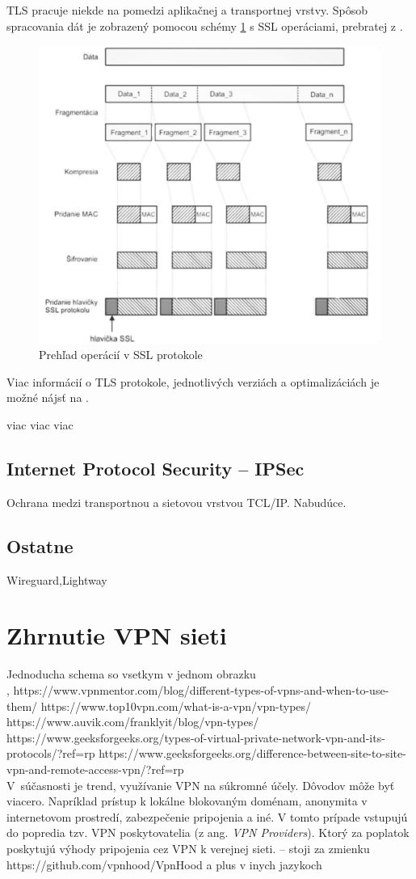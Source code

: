 TLS pracuje niekde na pomedzi aplikačnej a transportnej vrstvy. Spôsob spracovania dát je zobrazený pomocou schémy \ref{ssl} s SSL operáciami, prebratej z \cite{biks}. 
\begin{figure}[!ht]
	\centering
	\includegraphics[width=0.7\linewidth]{figures/ssl}
	\caption{Prehľad operácií v SSL protokole}
	\label{ssl}
\end{figure}

Viac informácií o TLS protokole, jednotlivých verziách a optimalizáciách je možné nájsť na \cite{tls}. 

viac viac viac

\subsection{Internet Protocol Security  -- IPSec}
Ochrana medzi transportnou a sietovou vrstvou TCL/IP.
Nabudúce. \cite{biks}

\subsection{Ostatne}
Wireguard,Lightway
 
\section{Zhrnutie VPN sieti}
Jednoducha schema so vsetkym v jednom obrazku \\

 
\cite{divvpn}, \cite{ciscovpn}
https://www.vpnmentor.com/blog/different-types-of-vpns-and-when-to-use-them/
https://www.top10vpn.com/what-is-a-vpn/vpn-types/
https://www.auvik.com/franklyit/blog/vpn-types/
https://www.geeksforgeeks.org/types-of-virtual-private-network-vpn-and-its-protocols/?ref=rp
https://www.geeksforgeeks.org/difference-between-site-to-site-vpn-and-remote-access-vpn/?ref=rp
\\
V~súčasnosti je trend, využívanie VPN na súkromné účely. Dôvodov môže byť viacero. Napríklad prístup k lokálne blokovaným doménam, anonymita v internetovom prostredí, zabezpečenie pripojenia a iné. V tomto prípade vstupujú do popredia tzv. VPN poskytovatelia (z ang. \textit{VPN Providers}). Ktorý za poplatok poskytujú výhody pripojenia cez VPN k verejnej sieti.
-- stoji za zmienku \\
https://github.com/vpnhood/VpnHood a plus v inych jazykoch 

